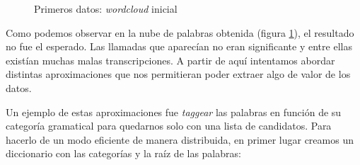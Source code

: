       \begin{figure}[!ht]
                    	\centering
                    	\caption{Primeros datos: \textit{wordcloud} inicial}
                    	\label{fig:wordcloudmalo1}
                    \end{figure}
              
              
Como podemos observar en la nube de palabras obtenida (figura \ref{fig:wordcloudmalo1}), el resultado no fue el esperado. Las llamadas que aparecían no eran significante y entre ellas existían muchas malas  transcripciones. A partir de aquí intentamos abordar distintas aproximaciones que nos permitieran poder extraer algo de valor de los datos.

Un ejemplo de estas aproximaciones fue \textit{taggear} las palabras en  función de su categoría gramatical para quedarnos solo con una lista de candidatos. Para hacerlo de un modo eficiente de manera distribuida, en primer lugar creamos un diccionario con las categorías y la raíz de las palabras: 

          
\vspace{0.5cm}
          
